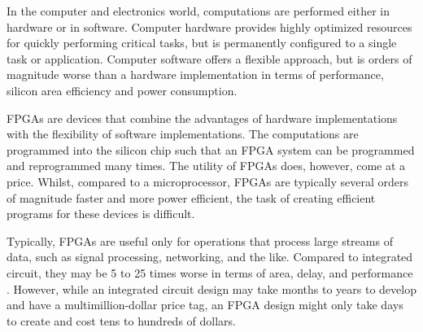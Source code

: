 In the computer and electronics world, computations are performed either in
hardware or in software. Computer hardware provides highly optimized resources
for quickly performing critical tasks, but is permanently configured to a single
task or application. Computer software offers a flexible approach, but is orders
of magnitude worse than a hardware implementation in terms of performance,
silicon area efficiency and power consumption.

\glspl{FPGA} are devices that combine the advantages of hardware implementations
with the flexibility of software implementations. The computations are
programmed into the silicon chip such that an FPGA system can be programmed and
reprogrammed many times. The utility of FPGAs does, however, come at a price.
Whilst, compared to a microprocessor, FPGAs are typically several orders of
magnitude faster and more power efficient, the task of creating efficient
programs for these devices is difficult.

Typically, \glspl{FPGA} are useful only for operations that process large
streams of data, such as signal processing, networking, and the like. Compared
to integrated circuit, they may be 5 to 25 times worse in terms of area, delay,
and performance \cite{Hauck:2007}. However, while an integrated circuit design
may take months to years to develop and have a multimillion-dollar price tag, an
\gls{FPGA} design might only take days to create and cost tens to hundreds of
dollars.
